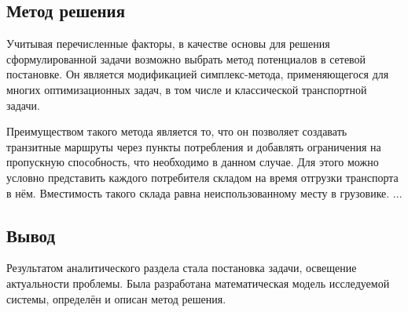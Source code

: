 \subsection{Метод решения}
	Учитывая перечисленные факторы, в качестве основы для решения сформулированной задачи возможно выбрать метод потенциалов в сетевой постановке. Он является модификацией симплекс-метода, применяющегося для многих оптимизационных задач, в том числе и классической транспортной задачи\cite{trans:potential}.
		
	Преимуществом такого метода является то, что он позволяет создавать транзитные маршруты через пункты потребления и добавлять ограничения на пропускную способность, что необходимо в данном случае. Для этого можно условно представить каждого потребителя складом на время отгрузки транспорта в нём. Вместимость такого склада равна неиспользованному месту в грузовике.	
	...

\subsection*{Вывод}
	Результатом аналитического раздела стала постановка задачи, освещение актуальности проблемы. Была разработана математическая модель исследуемой системы, определён и описан метод решения.
\pagebreak